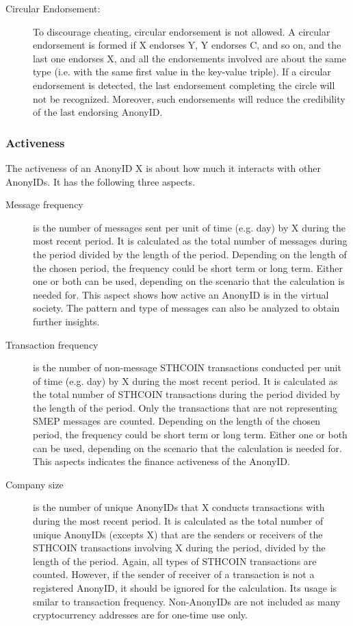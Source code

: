 \documentclass[12pt, a4paper]{article}
\begin{document}
\begin{description}
\item[Circular Endorsement:] To discourage cheating, circular endorsement is not allowed. A circular endorsement is formed if X endorses Y, Y endorses C, and so on, and the last one endorses X, and all the endorsements involved are about the same type (i.e. with the same first value in the key-value triple). If a circular endorsement is detected, the last endorsement completing the circle will not be recognized. Moreover, such endorsements will reduce the credibility of the last endorsing AnonyID.

\end{description}

\subsubsection{Activeness}

The activeness of an AnonyID X is about how much it interacts with other AnonyIDs. It has the following three aspects.

\begin{description}

\item[Message frequency] is the number of messages sent per unit of time (e.g. day) by X during the most recent period. It is calculated as the total number of messages during the period divided by the length of the period. Depending on the length of the chosen period, the frequency could be short term or long term. Either one or both can be used, depending on the scenario that the calculation is needed for. This aspect shows how active an AnonyID is in the virtual society. The pattern and type of messages can also be analyzed to obtain further insights.

\item[Transaction frequency] is the number of non-message STHCOIN transactions conducted per unit of time (e.g. day) by X during the most recent period. It is calculated as the total number of STHCOIN transactions during the period divided by the length of the period. Only the transactions that are not representing SMEP messages are counted. Depending on the length of the chosen period, the frequency could be short term or long term. Either one or both can be used, depending on the scenario that the calculation is needed for. This aspects indicates the finance activeness of the AnonyID. 

\item[Company size] is the number of unique AnonyIDs that X conducts transactions with during the most recent period. It is calculated as the total number of unique AnonyIDs (excepts X) that are the senders or receivers of the STHCOIN transactions involving X during the period, divided by the length of the period.  Again, all types of STHCOIN transactions are counted. However, if the sender of receiver of a transaction is not a registered AnonyID, it should be ignored for the calculation. Its usage is smilar to transaction frequency. Non-AnonyIDs are not included as many cryptocurrency addresses are for one-time use only.

\end{description}
\end{document}
